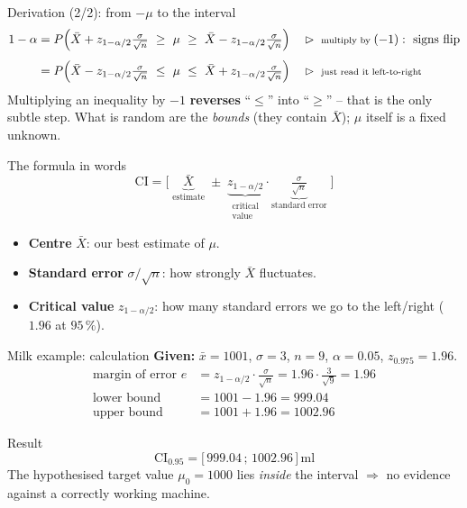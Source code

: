 \documentclass[aspectratio=169,11pt]{beamer}
\begin{document}
\begin{frame}{Derivation (2/2): from $-\mu$ to the interval}
  \footnotesize
  \begin{align*}
    1-\alpha
      &= P\!\left(\bar X+z_{1-\alpha/2}\tfrac{\sigma}{\sqrt n}\ \ge\ \mu\ \ge\ \bar X-z_{1-\alpha/2}\tfrac{\sigma}{\sqrt n}\right)
         && \rhd\ \text{\scriptsize multiply by }(-1):\ \text{signs flip}\\[4pt]
      &= P\!\left(\bar X-z_{1-\alpha/2}\tfrac{\sigma}{\sqrt n}\ \le\ \mu\ \le\ \bar X+z_{1-\alpha/2}\tfrac{\sigma}{\sqrt n}\right)
         && \rhd\ \text{\scriptsize just read it left-to-right}
  \end{align*}
  \footnotesize Multiplying an inequality by $-1$ \textbf{reverses} ``$\le$'' into
  ``$\ge$'' -- that is the only subtle step. What is random are the \emph{bounds}
  (they contain $\bar X$); $\mu$ itself is a fixed unknown.
\end{frame}

\begin{frame}{The formula in words}
  \[
    \text{CI} = \big[\;\underbrace{\bar{X}}_{\text{estimate}}
       \;\pm\; \underbrace{z_{1-\alpha/2}}_{\substack{\text{critical}\\\text{value}}}
       \cdot \underbrace{\tfrac{\sigma}{\sqrt{n}}}_{\text{standard error}}\;\big]
  \]
  \begin{itemize}\setlength{\itemsep}{4pt}
    \item \textbf{Centre} $\bar X$: our best estimate of $\mu$.
    \item \textbf{Standard error} $\sigma/\sqrt{n}$: how strongly $\bar X$
          fluctuates.
    \item \textbf{Critical value} $z_{1-\alpha/2}$: how many standard errors
          we go to the left/right ($1.96$ at $95\,\%$).
  \end{itemize}
\end{frame}

\begin{frame}{Milk example: calculation}
  \textbf{Given:} $\bar{x}=1001$, $\sigma=3$, $n=9$, $\alpha=0.05$,
  $z_{0.975}=1.96$.
  \begin{align*}
    \text{margin of error } e &= z_{1-\alpha/2}\cdot\frac{\sigma}{\sqrt{n}}
       = 1.96\cdot\frac{3}{\sqrt{9}} = 1.96\\[2pt]
    \text{lower bound}  &= 1001 - 1.96 = 999.04\\
    \text{upper bound}  &= 1001 + 1.96 = 1002.96
  \end{align*}
  \begin{exampleblock}{Result}
    \[
      \text{CI}_{0.95} = \bigl[\,999.04\,;\,1002.96\,\bigr]\,\text{ml}
    \]
    The hypothesised target value $\mu_0 = 1000$ lies \emph{inside} the
    interval $\Rightarrow$ no evidence against a correctly working machine.
  \end{exampleblock}
\end{frame}
\end{document}
